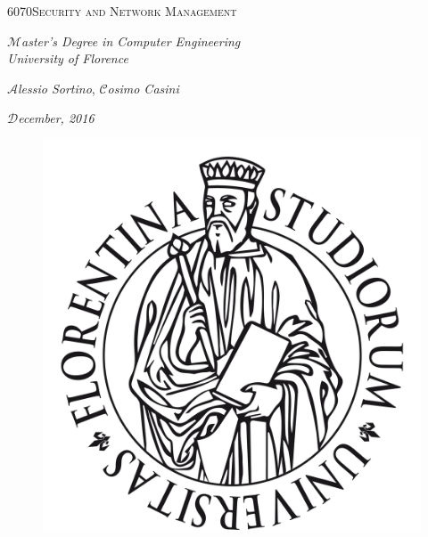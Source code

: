 \documentclass[a4paper,italian,11pt,openany]{book}
\makeatletter
\theoremstyle{definition}
\theoremstyle{proposition}
\theoremstyle{theorem}
\theoremstyle{definition}
\newcommand\HUGE{\@setfontsize\Huge{60}{70}}
\makeatother
\begin{document}
\begin{titlepage}
	\centering
	\vspace{1cm}
	
	{ {\HUGE \textsc{Security and Network Management}} \par}
	\vspace{3cm}
	{\huge $\mathcal{M}$\textit{aster's Degree in Computer Engineering\\University of Florence} \par}
	\vspace{0.5cm}
	{\LARGE $\mathcal{A}$\textit{lessio Sortino}, $\mathcal{C}$\textit{osimo Casini}\par}
	\vspace{0.7cm}
	{\Large $\mathcal{D}$\textit{ecember, 2016} \par}
	\begin{figure}[htbp]
		\centering
		\includegraphics[scale = 0.5]{header/logo-unifi.png}
		\label{header}
	\end{figure}
\end{titlepage}
\tableofcontents











%
\end{document}

